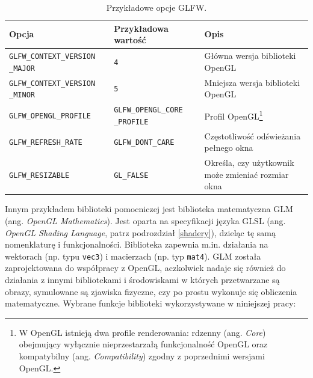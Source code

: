 \documentclass[12pt, twoside, openany]{report}
\begin{document}
\begin{table}[H]
\center
\footnotesize
\begin{tabulary}{\linewidth}{|L|L|L|}
\hline
\textbf {Opcja} & \textbf {Przykładowa wartość} & \textbf {Opis} \\
\hline
\texttt{GLFW\_CONTEXT\_VERSION \_MAJOR} & \texttt 4 & Główna wersja biblioteki OpenGL \\
\hline
\texttt{GLFW\_CONTEXT\_VERSION \_MINOR} & \texttt 5 & Mniejsza wersja biblioteki OpenGL \\
\hline
\texttt{GLFW\_OPENGL\_PROFILE} & \texttt{GLFW\_OPENGL\_CORE \_PROFILE}
 & Profil OpenGL\footnote{W OpenGL istnieją dwa profile renderowania: rdzenny (ang. \textit{Core}) obejmujący wyłącznie nieprzestarzałą funkcjonalność OpenGL oraz kompatybilny (ang. \textit{Compatibility}) zgodny z poprzednimi wersjami OpenGL.} %
 \\
\hline
\texttt{GLFW\_REFRESH\_RATE} & \texttt{GLFW\_DONT\_CARE} & Częstotliwość odświeżania pełnego okna \\
\hline
\texttt{GLFW\_RESIZABLE} & \texttt{GL\_FALSE} & Określa, czy użytkownik może zmieniać rozmiar okna \\
\hline
\end{tabulary}
\caption{Przykładowe opcje GLFW.}
\label{table:glfw}
\end{table}




Innym przykładem biblioteki pomocniczej jest biblioteka matematyczna GLM (ang. \textit{OpenGL Mathematics}). Jest oparta na specyfikacji języka GLSL (ang. \textit{OpenGL Shading Language}, patrz podrozdział \ref{shadery}), dzieląc tę samą nomenklaturę i funkcjonalności. Biblioteka zapewnia m.in. działania na wektorach (np. typu \texttt{vec3}) i macierzach (np. typ \texttt{mat4}). GLM została zaprojektowana do współpracy z OpenGL, aczkolwiek nadaje się również do działania z innymi bibliotekami i środowiskami w których przetwarzane są obrazy, symulowane są zjawiska fizyczne, czy po prostu wykonuje się obliczenia matematyczne. Wybrane funkcje biblioteki wykorzystywane w niniejszej pracy:
\end{document}

